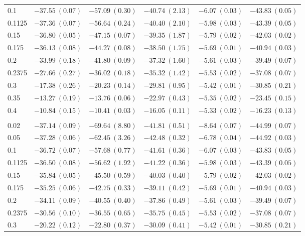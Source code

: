 \begin{table}[htbp]
\begin{tabular}{@{} l rrrrr @{}}
0.1 & $-37.55\ (0.07)$ & $-57.09\ (0.30)$ & $-40.74\ (2.13)$ & $-6.07\ (0.03)$ & $-43.83\ (0.05)$ \\
0.1125 & $-37.36\ (0.07)$ & $-56.64\ (0.24)$ & $-40.40\ (2.10)$ & $-5.98\ (0.03)$ & $-43.39\ (0.05)$ \\
0.15 & $-36.80\ (0.05)$ & $-47.15\ (0.07)$ & $-39.35\ (1.87)$ & $-5.79\ (0.02)$ & $-42.03\ (0.02)$ \\
0.175 & $-36.13\ (0.08)$ & $-44.27\ (0.08)$ & $-38.50\ (1.75)$ & $-5.69\ (0.01)$ & $-40.94\ (0.03)$ \\
0.2 & $-33.99\ (0.18)$ & $-41.80\ (0.09)$ & $-37.32\ (1.60)$ & $-5.61\ (0.03)$ & $-39.49\ (0.07)$ \\
0.2375 & $-27.66\ (0.27)$ & $-36.02\ (0.18)$ & $-35.32\ (1.42)$ & $-5.53\ (0.02)$ & $-37.08\ (0.07)$ \\
0.3 & $-17.38\ (0.26)$ & $-20.23\ (0.14)$ & $-29.81\ (0.95)$ & $-5.42\ (0.01)$ & $-30.85\ (0.21)$ \\
0.35 & $-13.27\ (0.19)$ & $-13.76\ (0.06)$ & $-22.97\ (0.43)$ & $-5.35\ (0.02)$ & $-23.45\ (0.15)$ \\
0.4 & $-10.84\ (0.15)$ & $-10.41\ (0.03)$ & $-16.05\ (0.11)$ & $-5.33\ (0.02)$ & $-16.23\ (0.13)$ \\
\addlinespace
\multicolumn{6}{@{}l}{\textit{Wide ($p \sim \mathcal{U}(0.05, 0.3)$)}} \\
0.02 & $-37.14\ (0.09)$ & $-69.64\ (8.80)$ & $-41.81\ (0.51)$ & $-8.64\ (0.07)$ & $-44.99\ (0.07)$ \\
0.05 & $-37.28\ (0.06)$ & $-62.45\ (3.26)$ & $-42.48\ (0.32)$ & $-6.78\ (0.04)$ & $-44.92\ (0.03)$ \\
0.1 & $-36.72\ (0.07)$ & $-57.68\ (0.77)$ & $-41.61\ (0.36)$ & $-6.07\ (0.03)$ & $-43.83\ (0.05)$ \\
0.1125 & $-36.50\ (0.08)$ & $-56.62\ (1.92)$ & $-41.22\ (0.36)$ & $-5.98\ (0.03)$ & $-43.39\ (0.05)$ \\
0.15 & $-35.84\ (0.05)$ & $-45.50\ (0.59)$ & $-40.03\ (0.40)$ & $-5.79\ (0.02)$ & $-42.03\ (0.02)$ \\
0.175 & $-35.25\ (0.06)$ & $-42.75\ (0.33)$ & $-39.11\ (0.42)$ & $-5.69\ (0.01)$ & $-40.94\ (0.03)$ \\
0.2 & $-34.11\ (0.09)$ & $-40.55\ (0.40)$ & $-37.86\ (0.49)$ & $-5.61\ (0.03)$ & $-39.49\ (0.07)$ \\
0.2375 & $-30.56\ (0.10)$ & $-36.55\ (0.65)$ & $-35.75\ (0.45)$ & $-5.53\ (0.02)$ & $-37.08\ (0.07)$ \\
0.3 & $-20.22\ (0.12)$ & $-22.80\ (0.37)$ & $-30.09\ (0.41)$ & $-5.42\ (0.01)$ & $-30.85\ (0.21)$ \\

\end{tabular}
\end{table}
